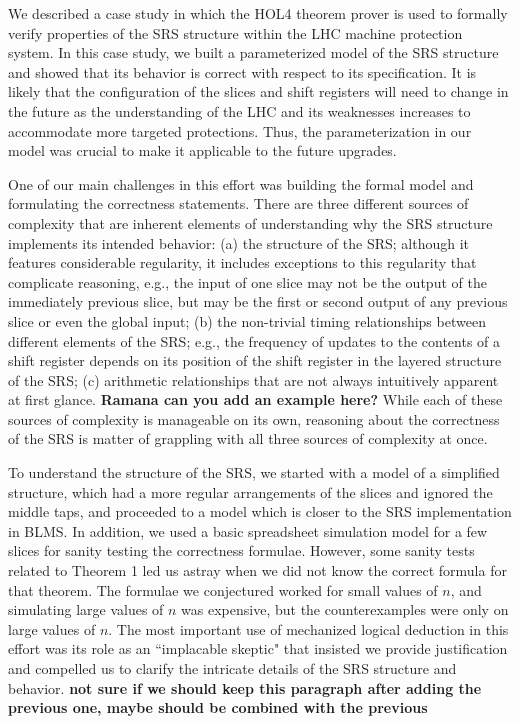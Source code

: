 \documentclass{llncs}
\begin{document}
We described a case study in which the HOL4 theorem prover is used to formally verify properties of the SRS structure within the LHC machine protection system.
In this case study, we built a parameterized model of the SRS structure and showed that its behavior is correct with respect to its specification.
It is likely that the configuration of the slices and shift registers will need to change in the future as the understanding of the LHC and its weaknesses increases to accommodate more targeted protections.
Thus, the parameterization in our model was crucial to make it applicable to the future upgrades.

One of our main challenges in this effort was building the formal model and formulating the correctness statements.
There are three different sources of complexity that are inherent elements of understanding why the SRS structure implements its intended behavior:
(a) the structure of the SRS; although it features considerable regularity, it includes exceptions to this regularity that complicate reasoning, e.g., the input of one slice may not be the output of the immediately previous slice, but may be the first or second output of any previous slice or even the global input;
(b) the non-trivial timing relationships between different elements of the SRS; e.g., the frequency of updates to the contents of a shift register depends on its position of the shift register in the layered structure of the SRS;
(c) arithmetic relationships that are not always intuitively apparent at first glance.
{\bf Ramana can you add an example here?}
While each of these sources of complexity is manageable on its own, reasoning about the correctness of the SRS is matter of grappling with all three sources of complexity at once.

To understand the structure of the SRS, we started with a model of a simplified structure, which had a more regular arrangements of the slices and ignored the middle taps, and proceeded to a model which is closer to the SRS implementation in BLMS.
In addition, we used a basic spreadsheet simulation model for a few slices for sanity testing the correctness formulae.
However, some sanity tests related to Theorem 1 led us astray when we did not know the correct formula for that theorem.
The formulae we conjectured worked for small values of $n$, and simulating large values of $n$ was expensive, but the counterexamples were only on large values of $n$.
The most important use of mechanized logical deduction in this effort was its role as an ``implacable skeptic" that insisted we provide justification and compelled us to clarify the intricate details of the SRS structure and behavior. {\bf not sure if we should keep this paragraph after adding the previous one, maybe should be combined with the previous}
\end{document}
